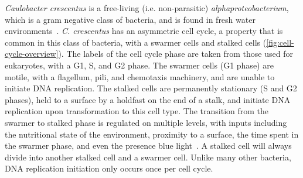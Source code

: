 

\textit{Caulobacter crescentus} is a free-living (i.e. non-parasitic) \textit{alphaproteobacterium}, which is a gram negative class of bacteria, and is found in fresh water environments~\cite{collier2016}.
\textit{C. crescentus} has an asymmetric cell cycle, a property that is common in this class of bacteria, with a swarmer cells and stalked cells (\cref{fig:cell-cycle-overview}).
The labels of the cell cycle phase are taken from those used for eukaryotes, with a G1, S, and G2 phase.
The swarmer cells (G1 phase) are motile, with a flagellum, pili, and chemotaxis machinery, and are unable to initiate DNA replication.
The stalked cells are permanently stationary (S and G2 phases), held to a surface by a holdfast on the end of a stalk, and initiate DNA replication upon transformation to this cell type.
The transition from the swarmer to stalked phase is regulated on multiple levels, with inputs including the nutritional state of the environment, proximity to a surface, the time spent in the swarmer phase, and even the presence blue light~\cite{berne2019,fiebig2014,purcell2007}.
A stalked cell will always divide into another stalked cell and a swarmer cell.
Unlike many other bacteria, DNA replication initiation only occurs once per cell cycle.
    
